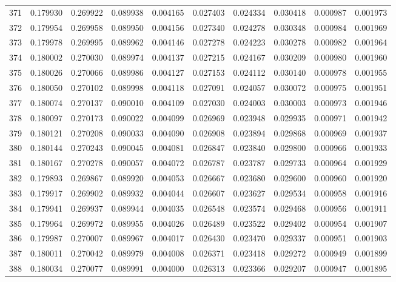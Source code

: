 \begin{tabular}{lrrrrrrrrr}
371 & 0.179930 & 0.269922 & 0.089938 & 0.004165 & 0.027403 & 0.024334 & 0.030418 & 0.000987 & 0.001973 \\
372 & 0.179954 & 0.269958 & 0.089950 & 0.004156 & 0.027340 & 0.024278 & 0.030348 & 0.000984 & 0.001969 \\
373 & 0.179978 & 0.269995 & 0.089962 & 0.004146 & 0.027278 & 0.024223 & 0.030278 & 0.000982 & 0.001964 \\
374 & 0.180002 & 0.270030 & 0.089974 & 0.004137 & 0.027215 & 0.024167 & 0.030209 & 0.000980 & 0.001960 \\
375 & 0.180026 & 0.270066 & 0.089986 & 0.004127 & 0.027153 & 0.024112 & 0.030140 & 0.000978 & 0.001955 \\
376 & 0.180050 & 0.270102 & 0.089998 & 0.004118 & 0.027091 & 0.024057 & 0.030072 & 0.000975 & 0.001951 \\
377 & 0.180074 & 0.270137 & 0.090010 & 0.004109 & 0.027030 & 0.024003 & 0.030003 & 0.000973 & 0.001946 \\
378 & 0.180097 & 0.270173 & 0.090022 & 0.004099 & 0.026969 & 0.023948 & 0.029935 & 0.000971 & 0.001942 \\
379 & 0.180121 & 0.270208 & 0.090033 & 0.004090 & 0.026908 & 0.023894 & 0.029868 & 0.000969 & 0.001937 \\
380 & 0.180144 & 0.270243 & 0.090045 & 0.004081 & 0.026847 & 0.023840 & 0.029800 & 0.000966 & 0.001933 \\
381 & 0.180167 & 0.270278 & 0.090057 & 0.004072 & 0.026787 & 0.023787 & 0.029733 & 0.000964 & 0.001929 \\
382 & 0.179893 & 0.269867 & 0.089920 & 0.004053 & 0.026667 & 0.023680 & 0.029600 & 0.000960 & 0.001920 \\
383 & 0.179917 & 0.269902 & 0.089932 & 0.004044 & 0.026607 & 0.023627 & 0.029534 & 0.000958 & 0.001916 \\
384 & 0.179941 & 0.269937 & 0.089944 & 0.004035 & 0.026548 & 0.023574 & 0.029468 & 0.000956 & 0.001911 \\
385 & 0.179964 & 0.269972 & 0.089955 & 0.004026 & 0.026489 & 0.023522 & 0.029402 & 0.000954 & 0.001907 \\
386 & 0.179987 & 0.270007 & 0.089967 & 0.004017 & 0.026430 & 0.023470 & 0.029337 & 0.000951 & 0.001903 \\
387 & 0.180011 & 0.270042 & 0.089979 & 0.004008 & 0.026371 & 0.023418 & 0.029272 & 0.000949 & 0.001899 \\
388 & 0.180034 & 0.270077 & 0.089991 & 0.004000 & 0.026313 & 0.023366 & 0.029207 & 0.000947 & 0.001895 \\

\end{tabular}

